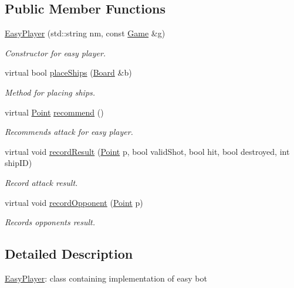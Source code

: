\subsection*{Public Member Functions}
\begin{DoxyCompactItemize}
\item 
\mbox{\hyperlink{class_easy_player_abf0692676d0bf3c0eb6f6741c621c7ec}{Easy\+Player}} (std\+::string nm, const \mbox{\hyperlink{class_game}{Game}} \&g)
\begin{DoxyCompactList}\small\item\em Constructor for easy player. \end{DoxyCompactList}\item 
virtual bool \mbox{\hyperlink{class_easy_player_a4b9d5815113f393615412f7a98176a6c}{place\+Ships}} (\mbox{\hyperlink{class_board}{Board}} \&b)
\begin{DoxyCompactList}\small\item\em Method for placing ships. \end{DoxyCompactList}\item 
virtual \mbox{\hyperlink{class_point}{Point}} \mbox{\hyperlink{class_easy_player_a9b00f4a9acc74ff688c609bc15bdbb4d}{recommend}} ()
\begin{DoxyCompactList}\small\item\em Recommends attack for easy player. \end{DoxyCompactList}\item 
virtual void \mbox{\hyperlink{class_easy_player_a254a5ddcd421e1dc71e45125e7ab04d8}{record\+Result}} (\mbox{\hyperlink{class_point}{Point}} p, bool valid\+Shot, bool hit, bool destroyed, int ship\+ID)
\begin{DoxyCompactList}\small\item\em Record attack result. \end{DoxyCompactList}\item 
virtual void \mbox{\hyperlink{class_easy_player_a2121149ace67b4a67a5dfa7633738ea3}{record\+Opponent}} (\mbox{\hyperlink{class_point}{Point}} p)
\begin{DoxyCompactList}\small\item\em Records opponent\textquotesingle{}s result. \end{DoxyCompactList}\end{DoxyCompactItemize}


\subsection{Detailed Description}
\mbox{\hyperlink{class_easy_player}{Easy\+Player}}\+: class containing implementation of easy bot 

